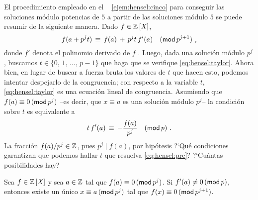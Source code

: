 \begin{obsHensel}\label{obs:hensel:taylor}
	El procedimiento empleado en el \ejemname~%
	\ref{ejem:hensel:cinco} para conseguir las soluciones
	m\'odulo potencias de $5$ a partir de las soluciones
	m\'odulo $5$ se puede resumir de la siguiente manera.
	Dado $f\in\polinomios\Enteros$,
	\begin{equation}
		\label{eq:hensel:taylor}
		f(a+p^jt)\,\equiv\,f(a)\,+\,p^jt\,f'(a)
			\modulo[p^{j+1}]
		\dispcomma
	\end{equation}
	donde $f'$ denota el polinomio derivado de $f$
	\quedacomoejercicio.%
	Luego, dada una soluci\'on m\'odulo $p^j$, buscamos
	$t\in\{0,\,1,\,\dots,\,p-1\}$ que haga que se verifique
	\eqref{eq:hensel:taylor}.
	Ahora bien, en lugar de buscar a fuerza bruta los valores
	de $t$ que hacen esto, podemos intentar despejarlo de la
	congruencia; con respecto a la variable $t$,
	\eqref{eq:hensel:taylor} es una ecuaci\'on lineal de
	congruencia. Asumiendo que $f(a)\equiv 0\tmodulo[p^j]$
	--es decir, que $x\equiv a$ es una soluci\'on m\'odulo $p^j$--
	la condici\'on sobre $t$ es equivalente a
	\begin{equation}
		\label{eq:hensel:pre}
		t\,f'(a)\,\equiv\,-\frac{f(a)}{p^j}\modulo[p]
		\dispstop
	\end{equation}
	La fracci\'on $f(a)/p^j\in\Enteros$, pues $p^j\mid f(a)$,
	por hip\'otesis ?`Qu\'e condiciones garantizan que
	podemos hallar $t$ que resuelva \eqref{eq:hensel:pre}?
	?`Cu\'antas posibilidades hay?
\end{obsHensel}

\begin{teoHensel}\label{teo:hensel}
	Sea $f\in\polinomios\Enteros$ y sea $a\in\Enteros$ tal
	que $f(a)\equiv 0\tmodulo[p^j]$.
	Si $f'(a)\neq 0\tmodulo[p]$, entonces existe un \'unico
	$x\equiv a\tmodulo[p^j]$ tal que $f(x)\equiv 0\tmodulo[p^{j+1}]$.
\end{teoHensel}

